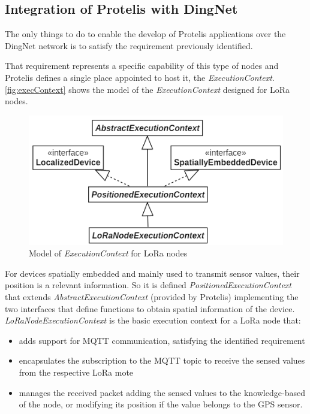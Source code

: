 \subsection{Integration of Protelis with DingNet}
\label{sec:PoverD}
The only things to do to enable the develop of Protelis applications over the DingNet network is to satisfy the requirement previously identified.

That requirement represents a specific capability of this type of nodes and Protelis defines a single place appointed to host it, the \mbox{\textit{ExecutionContext}}.
\autoref{fig:execContext} shows the model of the \mbox{\textit{ExecutionContext}} designed for LoRa nodes. 
\begin{figure}[H]
    \centering
    \includegraphics{figures/execContext.png}
    \caption{Model of \textit{ExecutionContext} for LoRa nodes}
    \label{fig:execContext}
\end{figure}
\noindent For devices spatially embedded and mainly used to transmit sensor values, their position is a relevant information. So it is defined \mbox{\textit{PositionedExecutionContext}} that extends \mbox{\textit{AbstractExecutionContext}} (provided by Protelis) implementing the two interfaces that define functions to obtain spatial information of the device.
\mbox{\textit{LoRaNodeExecutionContext}} is the basic execution context for a LoRa node that:
% 
\begin{itemize}
    \item adds support for MQTT communication, satisfying the identified requirement
    \item encapsulates the subscription to the MQTT topic to receive the sensed values from the respective LoRa mote
    \item manages the received packet adding the sensed values to the knowledge-based of the node, or modifying its position if the value belongs to the GPS sensor.
\end{itemize}
